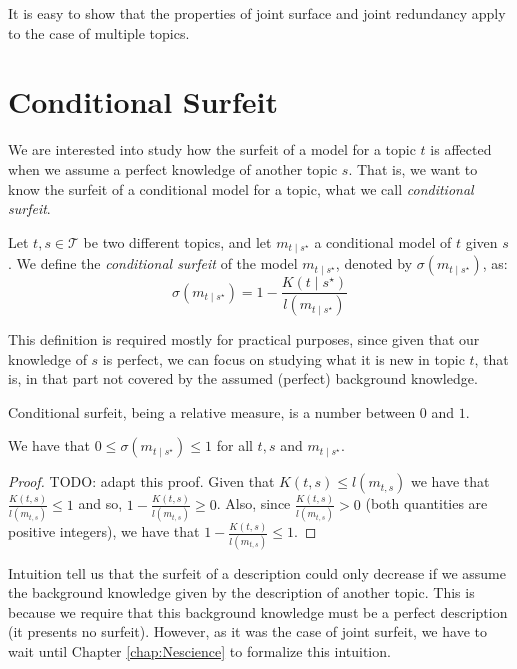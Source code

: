 It is easy to show that the properties of joint surface and joint redundancy apply to the case of multiple topics.

%
%

\section{Conditional Surfeit}

We are interested into study how the surfeit of a model for a topic $t$ is affected when we assume a perfect knowledge of another topic $s$. That is, we want to know the surfeit of a conditional model for a topic, what we call \emph{conditional surfeit}.

\begin{definition}
Let $t,s \in \mathcal{T}$ be two different topics, and let $m_{t \mid s^\star}$ a conditional model of $t$ given $s$. We define the \emph{conditional surfeit} of the model $m_{t \mid s^\star}$, denoted by $\sigma(m_{t \mid s^\star})$, as: 
\[
\sigma(m_{t \mid s^\star}) = 1 - \frac{K\left( t \mid s^\star \right)}{l \left( m_{t \mid s^\star} \right)}
\]
\end{definition}

This definition is required mostly for practical purposes, since given that our knowledge of $s$ is perfect, we can focus on studying what it is new in topic $t$, that is, in that part not covered by the assumed (perfect) background knowledge.

Conditional surfeit, being a relative measure, is a number between $0$ and $1$.

\begin{proposition}
We have that $0 \leq \sigma(m_{t \mid s^\star}) \leq 1$ for all $t,s$ and $m_{t \mid s^\star}$.
\end{proposition}
\begin{proof}
{\color{red} TODO: adapt this proof.}
Given that $K(t,s) \leq l(m_{t,s})$ we have that $\frac{K(t, s)}{l \left( m_{t,s} \right)} \leq 1$ and so, $1 - \frac{K(t, s)}{l \left( m_{t,s} \right)} \geq 0$. Also, since $\frac{K(t, s)}{l \left( m_{t,s} \right)} > 0$ (both quantities are positive integers), we have that $1 - \frac{K(t, s)}{l \left( m_{t,s} \right)} \leq 1$.
\end{proof}

Intuition tell us that the surfeit of a description could only decrease if we assume the background knowledge given by the description of another topic. This is because we require that this background knowledge must be a perfect description (it presents no surfeit). However, as it was the case of joint surfeit, we have to wait until Chapter \ref{chap:Nescience} to formalize this intuition.

